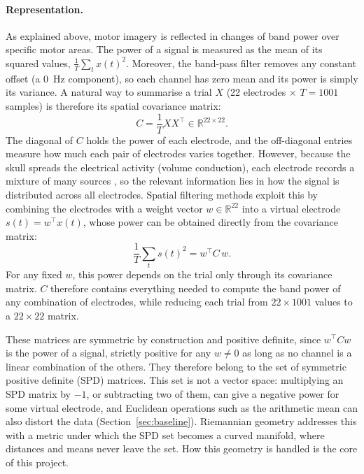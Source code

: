 \paragraph{Representation.}
As explained above, motor imagery is reflected in changes of band power over specific motor areas. The power of a signal is measured as the mean of its squared values, $\frac{1}{T}\sum_t x(t)^2$. Moreover, the band-pass filter removes any constant offset (a 0~Hz component), so each channel has zero mean and its power is simply its variance. A natural way to summarise a trial $X$ (22 electrodes $\times$ $T = 1001$ samples) is therefore its spatial covariance matrix:
\begin{equation}
  C = \frac{1}{T} X X^\top \in \mathbb{R}^{22 \times 22}.
  \label{eq:cov}
\end{equation}
The diagonal of $C$ holds the power of each electrode, and the off-diagonal entries measure how much each pair of electrodes varies together. However, because the skull spreads the electrical activity (volume conduction), each electrode records a mixture of many sources \citep{nunez2006}, so the relevant information lies in how the signal is distributed across all electrodes. Spatial filtering methods exploit this by combining the electrodes with a weight vector $w \in \mathbb{R}^{22}$ into a virtual electrode $s(t) = w^\top x(t)$, whose power can be obtained directly from the covariance matrix:
\begin{equation}
  \frac{1}{T} \sum_t s(t)^2 = w^\top C\, w.
  \label{eq:virtual_power}
\end{equation}
For any fixed $w$, this power depends on the trial only through its covariance matrix. $C$ therefore contains everything needed to compute the band power of any combination of electrodes, while reducing each trial from $22 \times 1001$ values to a $22 \times 22$ matrix.

These matrices are symmetric by construction and positive definite, since $w^\top C w$ is the power of a signal, strictly positive for any $w \neq 0$ as long as no channel is a linear combination of the others. They therefore belong to the set of symmetric positive definite (SPD) matrices. This set is not a vector space: multiplying an SPD matrix by $-1$, or subtracting two of them, can give a negative power for some virtual electrode, and Euclidean operations such as the arithmetic mean can also distort the data (Section~\ref{sec:baseline}). Riemannian geometry addresses this with a metric under which the SPD set becomes a curved manifold, where distances and means never leave the set. How this geometry is handled is the core of this project.

